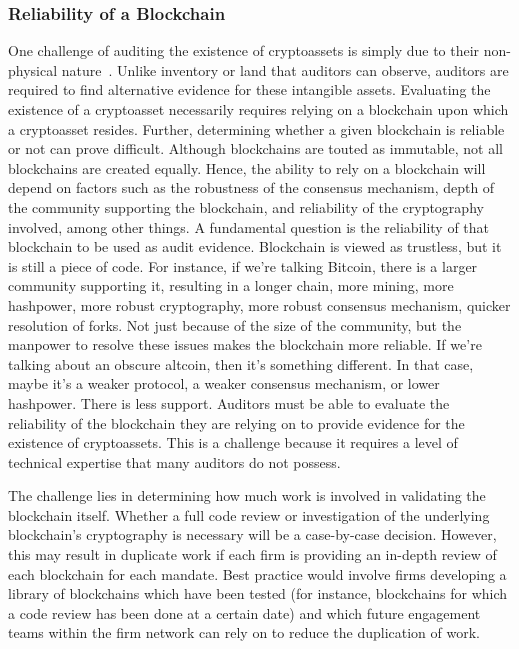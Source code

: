 \subsubsection{Reliability of a Blockchain}
One challenge of auditing the existence of cryptoassets is simply due to their non-physical nature~\cite{pimentel2021systemizing}. Unlike inventory or land that auditors can observe, auditors are required to find alternative evidence for these intangible assets. Evaluating the existence of a cryptoasset necessarily requires relying on a blockchain upon which a cryptoasset resides. Further, determining whether a given blockchain is reliable or not can prove difficult. Although blockchains are touted as immutable, not all blockchains are created equally. Hence, the ability to rely on a blockchain will depend on factors such as the robustness of the consensus mechanism, depth of the community supporting the blockchain, and reliability of the cryptography involved, among other things.
A fundamental question is the reliability of that blockchain to be used as audit evidence. Blockchain is viewed as trustless, but it is still a piece of code. For instance, if we're talking Bitcoin, there is a larger community supporting it, resulting in a longer chain, more mining, more hashpower, more robust cryptography, more robust consensus mechanism, quicker resolution of forks. Not just because of the size of the community, but the manpower to resolve these issues makes the blockchain more reliable. If we're talking about an obscure altcoin, then it's something different. In that case, maybe it's a weaker protocol, a weaker consensus mechanism, or lower hashpower. There is less support.
Auditors must be able to evaluate the reliability of the blockchain they are relying on to provide evidence for the existence of cryptoassets. This is a challenge because it requires a level of technical expertise that many auditors do not possess.

The challenge lies in determining how much work is involved in validating the blockchain itself. Whether a full code review or investigation of the underlying blockchain's cryptography is necessary will be a case-by-case decision. However, this may result in duplicate work if each firm is providing an in-depth review of each blockchain for each mandate. Best practice would involve firms developing a library of blockchains which have been tested (for instance, blockchains for which a code review has been done at a certain date) and which future engagement teams within the firm network can rely on to reduce the duplication of work.

